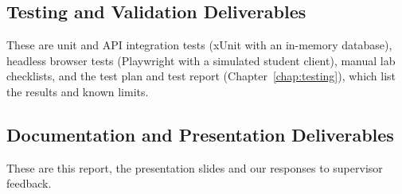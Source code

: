 \subsection{Testing and Validation Deliverables}
These are unit and API integration tests (xUnit with an in-memory database), headless browser tests (Playwright with a simulated student client), manual lab checklists, and the test plan and test report (Chapter~\ref{chap:testing}), which list the results and known limits.

\subsection{Documentation and Presentation Deliverables}
These are this report, the presentation slides and our responses to supervisor feedback.
